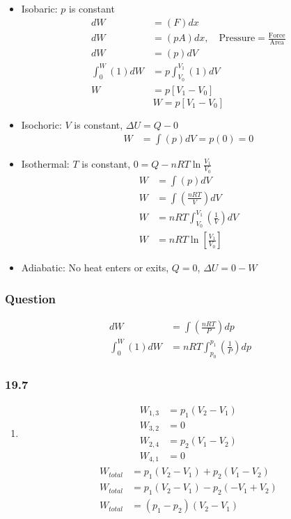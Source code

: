 \documentclass{article}
\begin{document}
\begin{itemize}
	\item Isobaric: $ p $ is constant
		\begin{align*}
			dW & = (F) dx \\
			dW & = (pA) dx, \quad \text{Pressure} = \frac{ \text{Force} }{ \text{Area} } \\
			dW & = (p) dV \\
			\int_{0}^{W} (1) dW & = p \int_{V_0}^{V_1} (1) dV \\
			W & = p \left[ V_1 - V_0 \right]
		\end{align*}
		\begin{equation}
			W = p \left[ V_1 - V_0 \right]
		\end{equation}
	\item Isochoric: $ V $ is constant, $ \Delta U = Q - 0 $
		\begin{align*}
			W & = \int (p) dV = p(0) = 0
		\end{align*}
	\item Isothermal: $ T $ is constant, $ 0 = Q - nRT \ln \frac{ V_1 }{ V_0 } $
		\begin{align*}
			W & = \int (p) dV \\
			W & = \int \left( \frac{ nRT }{ V } \right) dV \\
			W & = nRT \int_{V_0}^{V_1} \left( \frac{ 1 }{ V } \right) dV \\
			W & = nRT \ln \left[ \frac{ V_1 }{ V_0 } \right]
		\end{align*}
	\item Adiabatic: No heat enters or exits, $ Q = 0 $, $ \Delta U = 0 - W $
\end{itemize}

\subsubsection{Question}

\begin{align*}
	dW & = \int \left( \frac{ nRT }{ P } \right) dp \\
	\int_{0}^{W} (1) dW & = nRT \int_{p_0}^{p_1} \left( \frac{ 1 }{ P } \right) dp
\end{align*}

\subsubsection{19.7}

\begin{enumerate}[label = \textbf{(\alph*)}]
	\item
		\begin{align*}
			W_{1,3} & = p_1(V_2 - V_1) \\
			W_{3,2} & = 0 \\
			W_{2,4} & = p_2(V_1 - V_2) \\
			W_{4,1} & = 0
		\end{align*}
		\begin{align*}
			W_{total} & = p_1(V_2 - V_1) + p_2(V_1 - V_2) \\
			W_{total} & = p_1(V_2 - V_1) - p_2(-V_1 + V_2) \\
			W_{total} & = (p_1 - p_2)(V_2 - V_1)
		\end{align*}
\end{enumerate}
\end{document}
